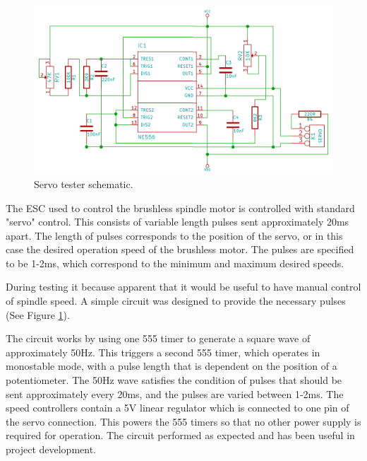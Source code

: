 \begin{figure}[ht!]
\centering
\includegraphics[width=160mm]{resources/servoexerciser.png}
\caption{Servo tester schematic.}
\label{fig:servotesterschem}
\end{figure}

The ESC used to control the brushless spindle motor is controlled with standard "servo" control. This consists of variable length pulses sent approximately 20ms apart.
The length of pulses corresponds to the position of the servo, or in this case the desired operation speed of the brushless motor. The pulses are specified to be 1-2ms,
which correspond to the minimum and maximum desired speeds.

During testing it because apparent that it would be useful to have manual control of spindle speed. A simple circuit was designed to provide the necessary pulses (See Figure \ref{fig:servotesterschem}).

The circuit works by using one 555 timer to generate a square wave of approximately 50Hz. This triggers a second 555 timer, which operates in monostable mode, with a pulse length
that is dependent on the position of a potentiometer. The 50Hz wave satisfies the condition of pulses that should be sent approximately every 20ms, and the pulses are varied between 1-2ms. The speed controllers
contain a 5V linear regulator which is connected to one pin of the servo connection. This powers the 555 timers so that no other power supply is required for operation. The circuit performed as expected and 
has been useful in project development.


